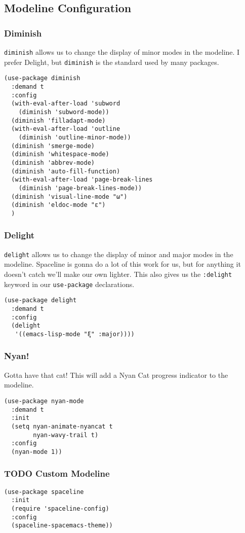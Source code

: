 \documentclass[11pt]{article}
\begin{document}
\subsection{Modeline Configuration}
\label{sec:orga43217c}
\subsubsection{Diminish}
\label{sec:org40eb921}
\texttt{diminish} allows us to change the display of minor modes in the
modeline. I prefer Delight, but \texttt{diminish} is the standard used by
many packages.
\begin{verbatim}
(use-package diminish
  :demand t
  :config
  (with-eval-after-load 'subword
    (diminish 'subword-mode))
  (diminish 'filladapt-mode)
  (with-eval-after-load 'outline
    (diminish 'outline-minor-mode))
  (diminish 'smerge-mode)
  (diminish 'whitespace-mode)
  (diminish 'abbrev-mode)
  (diminish 'auto-fill-function)
  (with-eval-after-load 'page-break-lines
    (diminish 'page-break-lines-mode))
  (diminish 'visual-line-mode "ω")
  (diminish 'eldoc-mode "ε")
  )
\end{verbatim}
\subsubsection{Delight}
\label{sec:orgb7698e8}
\texttt{delight} allows us to change the display of minor and major modes in
the modeline. Spaceline is gonna do a lot of this work for us, but for
anything it doesn't catch we'll make our own lighter. This also gives
us the \texttt{:delight} keyword in our \texttt{use-package} declarations.

\begin{verbatim}
(use-package delight
  :demand t
  :config
  (delight
   '((emacs-lisp-mode "ξ" :major))))
\end{verbatim}
\subsubsection{Nyan!}
\label{sec:org4d88021}
Gotta have that cat! This will add a Nyan Cat progress indicator to
the modeline.
\begin{verbatim}
(use-package nyan-mode
  :demand t
  :init
  (setq nyan-animate-nyancat t
        nyan-wavy-trail t)
  :config
  (nyan-mode 1))
\end{verbatim}
\subsubsection{{\bfseries\sffamily TODO} Custom Modeline}
\label{sec:orgd92799f}
\begin{verbatim}
(use-package spaceline
  :init
  (require 'spaceline-config)
  :config
  (spaceline-spacemacs-theme))
\end{verbatim}
\end{document}
